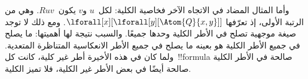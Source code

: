 \documentclass[../../../include/open-logic-section]{subfiles}
\begin{document}
وأما المثال المضاد في الاتجاه الآخر فخاصية الكلية: لكل~$u$ و$v$
يكون~$Ruv$. وهي من الرتبة الأولى، إذ تعرّفها
$\lforall[x][\lforall[y][\Atom{Q}{x,y}]]$. ومع ذلك لا توجد صيغة
موجهية تصلح في الأطر الكلية وحدها جميعًا. والسبب نتيجة لها
أهميتها: ما يصلح في جميع الأطر الكلية هو بعينه ما يصلح في جميع
الأطر الانعكاسية المتناظرة المتعدية. ولما كان في هذه الأخيرة أطر
غير كلية، كانت كل~!!{formula} صالحة في الأطر الكلية صالحة أيضًا
في بعض الأطر غير الكلية، فلا تميز الكلية.
\end{document}
